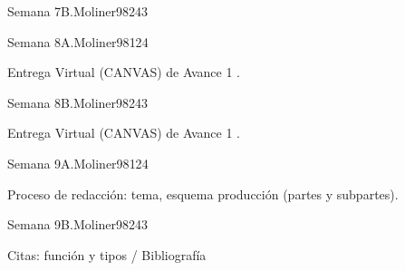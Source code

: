 \begin{syllabus}
\begin{unit}{Semana 7B.}{Moliner98}{24}{3}
   \begin{learningoutcomes}
      \item 
      \item
      \item 
      \end{learningoutcomes}
\end{unit}

\begin{unit}{Semana 8A.}{Moliner98}{12}{4}
   \begin{topics}
      \item Entrega Virtual (CANVAS) de Avance 1 .
   \end{topics}
   \begin{learningoutcomes}
      \item 
   \end{learningoutcomes}
\end{unit}

\begin{unit}{Semana 8B.}{Moliner98}{24}{3}
   \begin{topics}
      \item Entrega Virtual (CANVAS) de Avance 1 .
   \end{topics}

   \begin{learningoutcomes}
      \item 
      \item
      \item 
      \end{learningoutcomes}
\end{unit}

\begin{unit}{Semana 9A.}{Moliner98}{12}{4}
   \begin{topics}
      \item Proceso de redacción: tema, esquema producción (partes y subpartes).
   \end{topics}
   \begin{learningoutcomes}
      \item 
   \end{learningoutcomes}
\end{unit}

\begin{unit}{Semana 9B.}{Moliner98}{24}{3}
   \begin{topics}
      \item Citas: función y tipos / Bibliografía 
   \end{topics}

   \begin{learningoutcomes}
      \item 
      \item
      \item 
      \end{learningoutcomes}
\end{unit}



\end{syllabus}
